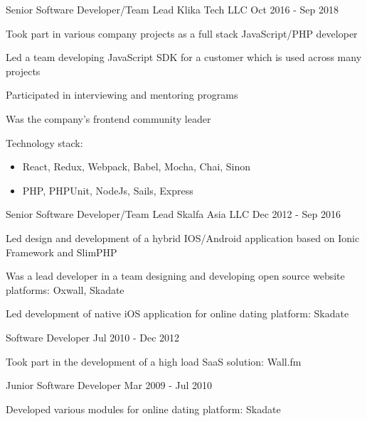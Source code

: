 \begin{cventries}
  \cventry
    {Senior Software Developer/Team Lead} %
    {Klika Tech LLC} %
    {} %
    {Oct 2016 - Sep 2018} %
    {
      \begin{cvitems}
        \item Took part in various company projects as a full stack JavaScript/PHP developer
        \item Led a team developing JavaScript SDK for a customer which is used across many projects
        \item Participated in interviewing and mentoring programs
        \item Was the company's frontend community leader
      \end{cvitems}
      \vspace{5mm}
      Technology stack:
      \begin{itemize}[leftmargin=2ex, nosep, noitemsep]
        \item React, Redux, Webpack, Babel, Mocha, Chai, Sinon
        \item PHP, PHPUnit, NodeJs, Sails, Express
      \end{itemize}
      \vspace{-4.0mm}
    }

  \cventry
    {Senior Software Developer/Team Lead} %
    {Skalfa Asia LLC} %
    {} %
    {Dec 2012 - Sep 2016} %
    {
      \begin{cvitems}
        \item Led design and development of a hybrid IOS/Android application based on Ionic Framework and SlimPHP
        \item Was a lead developer in a team designing and developing open source website platforms: Oxwall, Skadate
        \item Led development of native iOS application for online dating platform: Skadate
      \end{cvitems}
    }

  \cventry
    {Software Developer} %
    {} %
    {} %
    {Jul 2010 - Dec 2012} %
    {
      \begin{cvitems}
        \item Took part in the development of a high load SaaS solution: Wall.fm
      \end{cvitems}
    }

  \cventry
    {Junior Software Developer} %
    {} %
    {} %
    {Mar 2009 - Jul 2010} %
    {
      \begin{cvitems}
        \item Developed various modules for online dating platform: Skadate
      \end{cvitems}
    }

\end{cventries}
